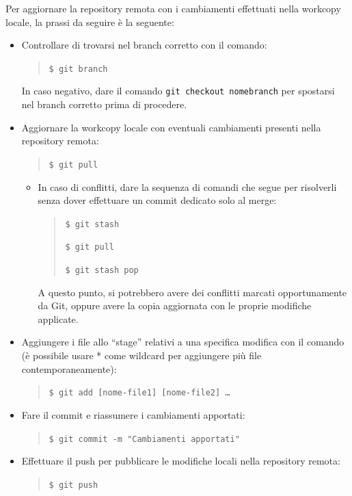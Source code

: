 	Per aggiornare la repository remota con i cambiamenti effettuati nella workcopy locale, la prassi da seguire è la seguente:
	\begin{itemize}
		\item Controllare di trovarsi nel branch corretto con il comando:
			\begin{quote}
				\texttt{\$\ git branch}
			\end{quote}
			In caso negativo, dare il comando \texttt{git checkout nomebranch} per spostarsi nel branch corretto prima di procedere.
		\item Aggiornare la workcopy locale con eventuali cambiamenti presenti nella repository remota:
			\begin{quote}
				\texttt{\$\ git pull}
			\end{quote}
		\begin{itemize}
			\item In caso di conflitti, dare la sequenza di comandi che segue per risolverli senza dover effettuare un commit
				dedicato solo al merge:
				\begin{quote}
					\texttt{\$\ git stash}\par
					\texttt{\$\ git pull}\par
					\texttt{\$\ git stash pop}\par				
				\end{quote}
				A questo punto, si potrebbero avere dei conflitti marcati opportunamente da Git, oppure avere la copia aggiornata
				con le proprie modifiche applicate.
		\end{itemize} 
		\item Aggiungere i file allo ``stage'' relativi a una specifica modifica con il comando (è possibile usare * come wildcard
			per aggiungere più file contemporaneamente):
			\begin{quote}
				\texttt{\$\ git add [nome-file1] [nome-file2] \dots}
			\end{quote}
		\item Fare il commit e riassumere i cambiamenti apportati:
		\begin{quote}
			\texttt{\$\ git commit -m "Cambiamenti apportati"}
		\end{quote}
		\item Effettuare il push per pubblicare le modifiche locali nella repository remota:
		\begin{quote}
			\texttt{\$\ git push}
		\end{quote}
	\end{itemize}


